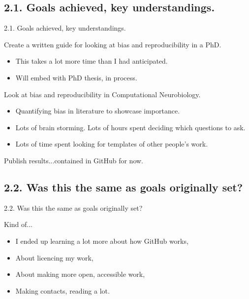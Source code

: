 \documentclass[t]{beamer}
\begin{document}
\subsection{2.1. Goals achieved, key understandings.}
\begin{frame}{2.1. Goals achieved, key understandings.}
	\begin{block}{Create a written guide for looking at bias and reproducibility in a PhD.}
  		\begin{itemize}    
  			\item This takes a lot more time than I had anticipated.
  			\item Will embed with PhD thesis, in process.
  		\end{itemize}    
	\end{block}
 
	\begin{block}{Look at bias and reproducibility in Computational Neurobiology.}
  		\begin{itemize}    
  			\item Quantifying bias in literature to showcase importance.
  			\item Lots of brain storming. Lots of hours spent deciding which questions to ask.
                \item Lots of time spent looking for templates of other people's work.
  		\end{itemize}    
	\end{block}
        \begin{block}{Publish results...contained in GitHub for now.}   
	\end{block}
\end{frame}

\subsection{2.2. Was this the same as goals originally set?}
\begin{frame}{2.2. Was this the same as goals originally set?}
	\begin{block}{Kind of...}
  		\begin{itemize}    
  			\item I ended up learning a lot more about how GitHub works,
  			\item About licencing my work,
                \item About making more open, accessible work,
                \item Making contacts, reading a lot.
  		\end{itemize}    
	\end{block}
\end{frame}
\end{document}
